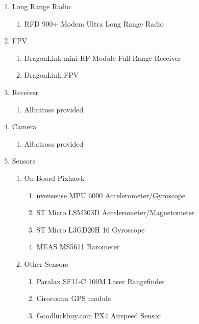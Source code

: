 \documentclass{article}
\begin{document}
\begin{enumerate}
\item Long Range Radio\\

\begin{enumerate}
\item RFD 900+ Modem Ultra Long Range Radio\\
\end{enumerate}

\item FPV\\

\begin{enumerate}
\item DragonLink mini RF Module Full Range Receiver\\
\item DragonLink FPV\\
\end{enumerate}

\item Receiver\\

\begin{enumerate}
\item Albatross provided\\
\end{enumerate}

\item Camera\\

\begin{enumerate}
\item Albatross provided\\
\end{enumerate}

\item Sensors\\

\begin{enumerate}
\item On-Board Pixhawk\\
\begin{enumerate}
\item nvensense MPU 6000 Accelerometer/Gyroscope\\
\item ST Micro LSM303D Accelerometer/Magnetometer\\
\item ST Micro L3GD20H 16 Gyroscope\\
\item MEAS MS5611 Barometer\\
\end{enumerate}
\item Other Sensors\\
\begin{enumerate}
\item Paralax SF11-C 100M Laser Rangefinder\\
\item Cirocomm GPS module\\
\item Goodluckbuy.com PX4 Airspeed Sensor\\
\end{enumerate}
\end{enumerate}


\end{enumerate}
\end{document}
